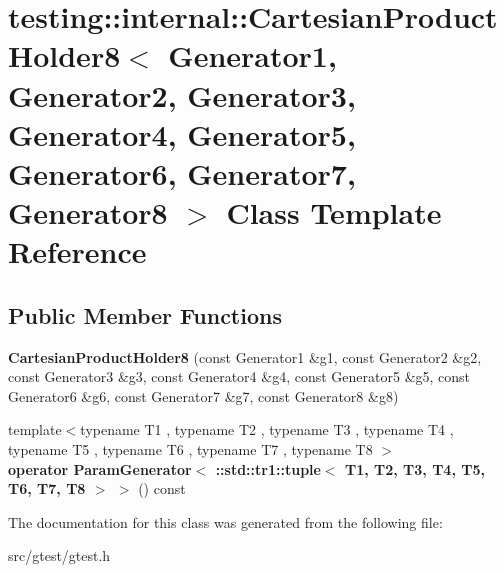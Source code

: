 \hypertarget{classtesting_1_1internal_1_1_cartesian_product_holder8}{}\section{testing\+:\+:internal\+:\+:Cartesian\+Product\+Holder8$<$ Generator1, Generator2, Generator3, Generator4, Generator5, Generator6, Generator7, Generator8 $>$ Class Template Reference}
\label{classtesting_1_1internal_1_1_cartesian_product_holder8}
\subsection*{Public Member Functions}
\begin{DoxyCompactItemize}
\item 
\mbox{\label{classtesting_1_1internal_1_1_cartesian_product_holder8_adacdd7a2e15963d1b2f559d65f6b2aac}} 
{\bfseries Cartesian\+Product\+Holder8} (const Generator1 \&g1, const Generator2 \&g2, const Generator3 \&g3, const Generator4 \&g4, const Generator5 \&g5, const Generator6 \&g6, const Generator7 \&g7, const Generator8 \&g8)
\item 
\mbox{\label{classtesting_1_1internal_1_1_cartesian_product_holder8_a9e152a340192e26772962cc2c0972564}} 
{\footnotesize template$<$typename T1 , typename T2 , typename T3 , typename T4 , typename T5 , typename T6 , typename T7 , typename T8 $>$ }\\{\bfseries operator Param\+Generator$<$ \+::std\+::tr1\+::tuple$<$ T1, T2, T3, T4, T5, T6, T7, T8 $>$ $>$} () const
\end{DoxyCompactItemize}


The documentation for this class was generated from the following file\+:\begin{DoxyCompactItemize}
\item 
src/gtest/gtest.\+h\end{DoxyCompactItemize}
